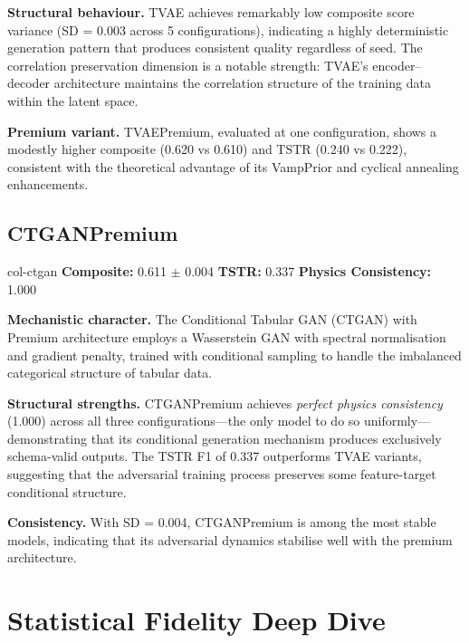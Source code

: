 \documentclass[11pt, a4paper]{report}
\begin{document}
\textbf{Structural behaviour.} TVAE achieves remarkably low composite score variance (SD = 0.003 across 5 configurations), indicating a highly deterministic generation pattern that produces consistent quality regardless of seed. The correlation preservation dimension is a notable strength: TVAE's encoder--decoder architecture maintains the correlation structure of the training data within the latent space.

\textbf{Premium variant.} TVAEPremium, evaluated at one configuration, shows a modestly higher composite (0.620 vs 0.610) and TSTR (0.240 vs 0.222), consistent with the theoretical advantage of its VampPrior and cyclical annealing enhancements.

\section{\textcolor{col-ctgan}{CTGANPremium}}

\begin{modelbox}[title={\textbf{CTGANPremium} --- 3 configurations}]{col-ctgan}
\textbf{Composite:} 0.611 $\pm$ 0.004 \quad \textbf{TSTR:} 0.337 \quad \textbf{Physics Consistency:} 1.000
\end{modelbox}

\textbf{Mechanistic character.} The Conditional Tabular GAN (CTGAN) with Premium architecture employs a Wasserstein GAN with spectral normalisation and gradient penalty, trained with conditional sampling to handle the imbalanced categorical structure of tabular data.

\textbf{Structural strengths.} CTGANPremium achieves \emph{perfect physics consistency} (1.000) across all three configurations---the only model to do so uniformly---demonstrating that its conditional generation mechanism produces exclusively schema-valid outputs. The TSTR F1 of 0.337 outperforms TVAE variants, suggesting that the adversarial training process preserves some feature-target conditional structure.

\textbf{Consistency.} With SD = 0.004, CTGANPremium is among the most stable models, indicating that its adversarial dynamics stabilise well with the premium architecture.


\chapter{Statistical Fidelity Deep Dive}
\end{document}
